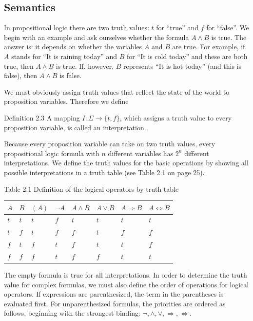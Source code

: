 \documentclass[10pt]{book}
\begin{document}
\subsection{Semantics}
In propositional logic there are two truth values: $t$ for ``true'' and $f$ for ``false''. We begin with an example and ask ourselves whether the formula $A \wedge B$ is true. The answer is: it depends on whether the variables $A$ and $B$ are true. For example, if $A$ stands for ``It is raining today'' and $B$ for ``It is cold today'' and these are both true, then $A \wedge B$ is true. If, however, $B$ represents ``It is hot today'' (and this is false), then $A \wedge B$ is false.

We must obviously assign truth values that reflect the state of the world to proposition variables. Therefore we define
\begin{displayquote}
Definition 2.3 A mapping $I: \Sigma \rightarrow \{t, f\}$, which assigns a truth value to every proposition variable, is called an interpretation.
\end{displayquote}

Because every proposition variable can take on two truth values, every propositional logic formula with $n$ different variables has $2^{n}$ different interpretations. We define the truth values for the basic operations by showing all possible interpretations in a truth table (see Table 2.1 on page 25).

Table 2.1 Definition of the logical operators by truth table
\begin{center}
\begin{tabular}{llllllll}
\hline
$A$ & $B$ & $(A)$ & $\neg A$ & $A \wedge B$ & $A \vee B$ & $A \Rightarrow B$ & $A \Leftrightarrow B$ \\
\hline
$t$ & $t$ & $t$ & $f$ & $t$ & $t$ & $t$ & $t$ \\
\hline
$t$ & $f$ & $t$ & $f$ & $f$ & $t$ & $f$ & $f$ \\
\hline
$f$ & $t$ & $f$ & $t$ & $f$ & $t$ & $t$ & $f$ \\
\hline
$f$ & $f$ & $f$ & $t$ & $f$ & $f$ & $t$ & $t$ \\
\hline
\end{tabular}
\end{center}

The empty formula is true for all interpretations. In order to determine the truth value for complex formulas, we must also define the order of operations for logical operators. If expressions are parenthesized, the term in the parentheses is evaluated first. For unparenthesized formulas, the priorities are ordered as follows, beginning with the strongest binding: $\neg, \wedge, \vee, \Rightarrow, \Leftrightarrow$.
\end{document}
